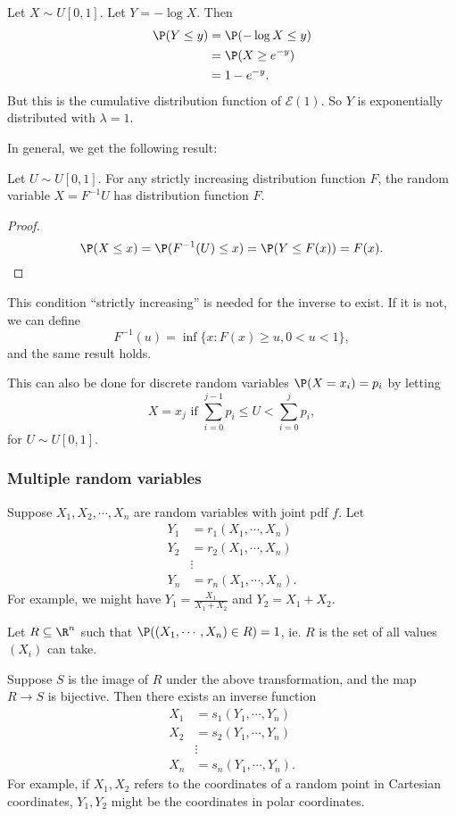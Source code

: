 \documentclass[a4paper]{article}
\begin{document}
\begin{eg}
  Let $X\sim U[0, 1]$. Let $Y = -\log X$. Then
  \begin{align*}
    \P(Y \leq y) &= \P(-\log X \leq y)\\
    &= \P(X \geq e^{-y})\\
    &= 1 - e^{-y}.
  \end{align*}
  But this is the cumulative distribution function of $\mathcal{E}(1)$. So $Y$ is exponentially distributed with $\lambda = 1$.
\end{eg}

In general, we get the following result:
\begin{thm}
  Let $U\sim U[0, 1]$. For any strictly increasing distribution function $F$, the random variable $X = F^{-1}U$ has distribution function $F$.
\end{thm}

\begin{proof}
  \[
    \P(X \leq x) = \P(F^{-1}(U) \leq x) = \P(Y \leq F(x)) = F(x).
  \]
\end{proof}
This condition ``strictly increasing'' is needed for the inverse to exist. If it is not, we can define
\[
  F^{-1}(u) = \inf\{x: F(x)\geq u, 0 < u < 1\},
\]
and the same result holds.

This can also be done for discrete random variables $\P(X = x_i) = p_i$ by letting
\[
  X = x_j\text{ if }\sum_{i = 0}^{j - 1}p_i \leq U < \sum_{i = 0}^j p_i,
\]
for $U\sim U[0, 1]$.

\subsubsection*{Multiple random variables}
Suppose $X_1, X_2, \cdots, X_n$ are random variables with joint pdf $f$. Let
\begin{align*}
  Y_1 &= r_1(X_1, \cdots, X_n)\\
  Y_2 &= r_2(X_1, \cdots, X_n)\\
  &\vdots \\
  Y_n &= r_n(X_1, \cdots, X_n).
\end{align*}
For example, we might have $Y_1 = \frac{X_1}{X_1 + X_2}$ and $Y_2 = X_1 + X_2$.

Let $R\subseteq \R^n$ such that $\P((X_1, \cdots, X_n)\in R) = 1$, ie. $R$ is the set of all values $(X_i)$ can take.

Suppose $S$ is the image of $R$ under the above transformation, and the map $R\to S$ is bijective. Then there exists an inverse function
\begin{align*}
  X_1 &= s_1(Y_1, \cdots, Y_n)\\
  X_2 &= s_2(Y_1, \cdots, Y_n)\\
  &\vdots\\
  X_n &= s_n(Y_1, \cdots, Y_n).
\end{align*}
For example, if $X_1, X_2$ refers to the coordinates of a random point in Cartesian coordinates, $Y_1, Y_2$ might be the coordinates in polar coordinates.
\end{document}

